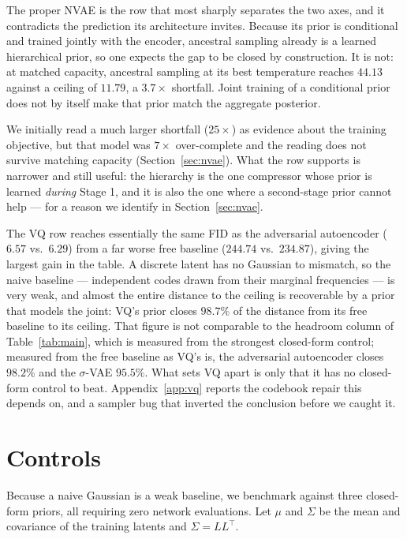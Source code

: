 \documentclass[sigconf,nonacm]{acmart}
\begin{document}
The proper NVAE is the row that most sharply separates the two axes, and it
contradicts the prediction its architecture invites. Because its prior is
conditional and trained jointly with the encoder, ancestral sampling already is
a learned hierarchical prior, so one expects the gap to be closed by
construction. It is not: at matched capacity, ancestral sampling at its best temperature
reaches $44.13$ against a ceiling of $11.79$, a $3.7\times$ shortfall. Joint training of a conditional prior
does not by itself make that prior match the aggregate posterior.

We initially read a much larger shortfall ($25\times$) as evidence about the
training objective, but that model was $7\times$ over-complete and the reading
does not survive matching capacity (Section~\ref{sec:nvae}). What the row
supports is narrower and still useful: the hierarchy is the one compressor whose
prior is learned \emph{during} Stage 1, and it is also the one where a
second-stage prior cannot help --- for a reason we identify in
Section~\ref{sec:nvae}.

The VQ row reaches essentially the same FID as the adversarial autoencoder
($6.57$ vs.\ $6.29$) from a far worse free baseline ($244.74$ vs.\ $234.87$),
giving the largest gain in the table. A discrete latent has no Gaussian to
mismatch, so the naive baseline --- independent codes drawn from their marginal
frequencies --- is very weak, and almost the entire distance to the ceiling is
recoverable by a prior that models the joint: VQ's prior closes $98.7\%$ of
the distance from its free baseline to its ceiling. That figure is not
comparable to the headroom column of Table~\ref{tab:main}, which is measured
from the strongest closed-form control; measured from the free baseline as VQ's
is, the adversarial autoencoder closes $98.2\%$ and the $\sigma$-VAE $95.5\%$.
What sets VQ apart is only that it has no closed-form control to beat. Appendix~\ref{app:vq} reports the codebook repair this depends on, and a
sampler bug that inverted the conclusion before we caught it.

\section{Controls}
\label{sec:controls}

Because a naive Gaussian is a weak baseline, we benchmark against three
closed-form priors, all requiring zero network evaluations. Let $\mu$ and
$\Sigma$ be the mean and covariance of the training latents and
$\Sigma = LL^\top$.
\end{document}
